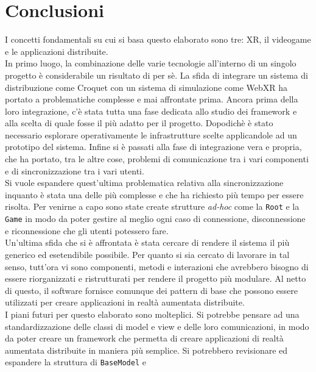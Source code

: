 \chapter*{Conclusioni}
I concetti fondamentali su cui si basa questo elaborato sono tre: XR, il videogame e le applicazioni distribuite.\\
\newline
In primo luogo, la combinazione delle varie tecnologie all'interno di un singolo progetto è considerabile un risultato di per sè. La sfida di integrare un sistema di distribuzione
come Croquet con un sistema di simulazione come WebXR ha portato a problematiche complesse e mai affrontate prima. Ancora prima della loro integrazione, c'è stata tutta una fase 
dedicata allo studio dei framework e alla scelta di quale fosse il più adatto per il progetto. Dopodichè è stato necessario esplorare operativamente le infrastrutture scelte 
applicandole ad un prototipo del sistema. Infine si è passati alla fase di integrazione vera e propria, che ha portato, tra le altre cose, problemi di comunicazione tra i vari 
componenti e di sincronizzazione tra i vari utenti.\\
Si vuole espandere quest'ultima problematica relativa alla sincronizzazione inquanto è stata una delle più complesse e che ha richiesto più tempo per essere risolta. Per venirne a 
capo sono state create strutture \textit{ad-hoc} come la \texttt{Root} e la \texttt{Game} in modo da poter gestire al meglio ogni caso di connessione, disconnessione e riconnessione 
che gli utenti potessero fare.\\
Un'ultima sfida che si è affrontata è stata cercare di rendere il sistema il più generico ed esetendibile possibile. Per quanto si sia cercato di lavorare in tal senso, tutt'ora vi sono
componenti, metodi e interazioni che avrebbero bisogno di essere riorganizzati e ristrutturati per rendere il progetto più modulare. Al netto di questo, il software fornisce comunque
dei pattern di base che possono essere utilizzati per creare applicazioni in realtà aumentata distribuite.\\
\newline
I piani futuri per questo elaborato sono molteplici. Si potrebbe pensare ad una standardizzazione delle classi di model e view e delle loro comunicazioni, in modo da poter creare
un framework che permetta di creare applicazioni di realtà aumentata distribuite in maniera più semplice. Si potrebbero revisionare ed espandere la struttura di \texttt{BaseModel} e
